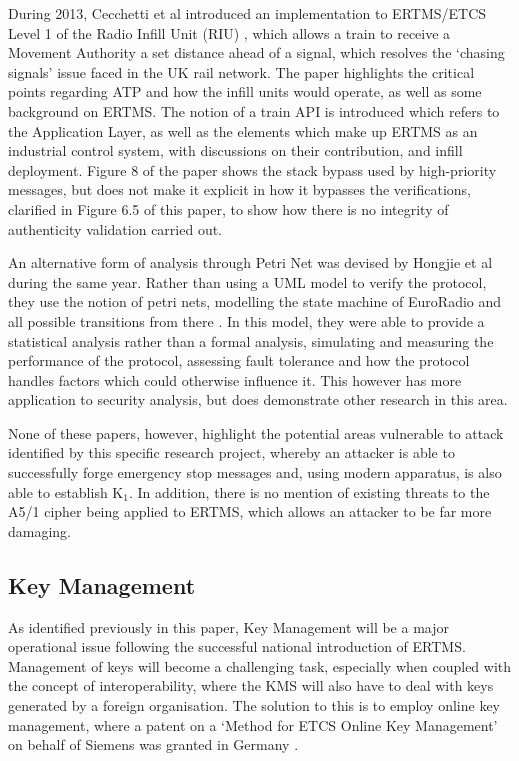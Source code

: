 \documentclass[twoside,11pt,a4paper]{article}
\begin{document}
During 2013, Cecchetti et al introduced an implementation to ERTMS/ETCS Level 1 of the Radio Infill Unit (RIU) \citep{Cecchetti13a}, which allows a train to receive a Movement Authority a set distance ahead of a signal, which resolves the `chasing signals' issue faced in the UK rail network. The paper highlights the critical points regarding ATP and how the infill units would operate, as well as some background on ERTMS. The notion of a train API is introduced which refers to the Application Layer, as well as the elements which make up ERTMS as an industrial control system, with discussions on their contribution, and infill deployment. Figure 8 of the paper shows the stack bypass used by high-priority messages, but does not make it explicit in how it bypasses the verifications, clarified in Figure 6.5 of this paper, to show how there is no integrity of authenticity validation carried out.

An alternative form of analysis through Petri Net was devised by Hongjie et al during the same year. Rather than using a UML model to verify the protocol, they use the notion of petri nets, modelling the state machine of EuroRadio and all possible transitions from there \citep{Hongjie13a}. In this model, they were able to provide a statistical analysis rather than a formal analysis, simulating and measuring the performance of the protocol, assessing fault tolerance and how the protocol handles factors which could otherwise influence it. This however has more application to security analysis, but does demonstrate other research in this area.

None of these papers, however, highlight the potential areas vulnerable to attack identified by this specific research project, whereby an attacker is able to successfully forge emergency stop messages and, using modern apparatus, is also able to establish K$_1$. In addition, there is no mention of existing threats to the A5/1 cipher being applied to ERTMS, which allows an attacker to be far more damaging.

\subsection{Key Management}
As identified previously in this paper, Key Management will be a major operational issue following the successful national introduction of ERTMS. Management of keys will become a challenging task, especially when coupled with the concept of interoperability, where the KMS will also have to deal with keys generated by a foreign organisation. The solution to this is to employ online key management, where a patent on a `Method for ETCS Online Key Management' on behalf of Siemens was granted in Germany \citep{SiemensPatent}.
\end{document}
